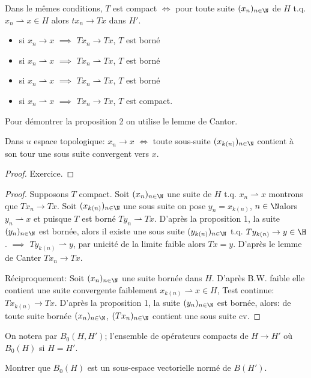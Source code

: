 \begin{proposition}
	Dans le mêmes conditions, $T$ est compact $\iff$ pour toute suite $(x_n)_{n\in \N}$ de $H$ t.q. $x_n\rightharpoonup x\in H$ alors $tx_n\to Tx$ dans $H'$.
\end{proposition}
\begin{remark}
	\begin{itemize}
	\leavevmode
		\item si $x_n\to x$ $\implies$ $Tx_n\to Tx$, $T$ est borné
		\item si $x_n\rightharpoonup x$ $\implies$ $Tx_n\rightharpoonup Tx$, $T$ est borné
		\item si $x_n\rightharpoonup x$ $\implies$ $Tx_n\rightharpoonup Tx$, $T$ est borné
		\item si $x_n\rightharpoonup x$ $\implies$ $Tx_n\to Tx$, $T$ est compact.
	\end{itemize}
\end{remark}
Pour démontrer la proposition 2 on utilise le lemme de Cantor.
\begin{lemme}
	Dans $u$ espace topologique: $x_n\to x$ $\iff$ toute sous-suite $(x_{k(n)})_{n\in\N}$ contient à son tour une sous suite convergent vers $x$.
\end{lemme}
\begin{proof}
	Exercice.
\end{proof}
\begin{proof}
	Supposons $T$ compact. Soit $(x_n)_{n\in\N}$ une suite de $H$ t.q. $x_n\rightharpoonup x$ montrons que $Tx_n\to Tx$. Soit $(x_{k(n)})_{n\in\N}$ une sous suite on pose $y_n=x_{k(n)}$, $n\in\N $alors $y_n\rightharpoonup x$ et puisque $T$ est borné $Ty_n\rightharpoonup Tx$. D'après la proposition 1, la suite $(y_n)_{n\in\N}$ est bornée, alors il existe une sous suite $(y_{k(n)})_{n\in\N}$ t.q. $Ty_{k(n)}\to y\in\H$. $\implies$ $Ty_{k(n)}\rightharpoonup y$, par unicité de la limite faible alors $Tx=y$. D'après le lemme de Canter $Tx_n\to Tx$.
	
	Réciproquement: Soit $(x_n)_{n\in\N}$ une suite bornée dans $H$. D'après B.W. faible elle contient une suite convergente faiblement $x_{k(n)}\rightharpoonup x\in H$, Test continue: $Tx_{k(n)}\to Tx$. D'après la proposition 1, la suite $(y_n)_{n\in\N}$ est bornée, alors: de toute suite bornée $(x_n)_{n\in\N}$, $(Tx_n)_{n\in\N}$ contient une sous suite cv.
\end{proof}

	On notera par $B_0(H,H')$; l'ensemble de opérateurs compacts de $H\rightarrow H'$ où $B_0(H)$ si $H=H'$.
	\begin{exercise}
		Montrer que $B_0(H)$ est un sous-espace vectorielle normé de $B(H')$.
	\end{exercise}

